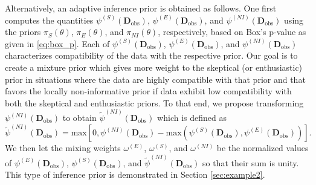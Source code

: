 \documentclass[AMA,STIX1COL,doublespace]{WileyNJD-v2}
\begin{document}
{
Alternatively, an adaptive inference prior is obtained as follows.
One first computes the quantities $\psi^{(S)}(\mathbf{D}_{\text{obs}})$, $\psi^{(E)}(\mathbf{D}_{\text{obs}})$, and $\psi^{(NI)}(\mathbf{D}_{\text{obs}})$ using the priors $\pi_S(\theta)$, 
$\pi_E(\theta)$, and $\pi_{NI}(\theta)$, respectively, based on Box's p-value as given in \eqref{eq:box_p}. 
Each of $\psi^{(S)}(\mathbf{D}_{\text{obs}})$, $\psi^{(E)}(\mathbf{D}_{\text{obs}})$, and $\psi^{(NI)}(\mathbf{D}_{\text{obs}})$ characterizes compatibility of the data with the respective prior.
Our goal is to create a mixture prior which gives more weight to the skeptical (or enthusiastic) prior in situations where the data are highly compatible 
with that prior and that favors the locally non-informative prior if data exhibit low compatibility with both the skeptical and enthusiastic priors.
 To that end, we propose transforming $\psi^{(NI)}(\mathbf{D}_{\text{obs}})$ to obtain $\tilde{\psi}^{(NI)}(\mathbf{D}_{\text{obs}})$ which is defined as
\begin{equation}\label{eq:3partmix_ni}
\tilde{\psi}^{(NI)}(\mathbf{D}_{\text{obs}})=\text{max}\left[0,\psi^{(NI)}(\mathbf{D}_{\text{obs}})-\text{max}\left(\psi^{(S)}(\mathbf{D}_{\text{obs}}),\psi^{(E)}(\mathbf{D}_{\text{obs}})\right)\right].
\end{equation}	
We then let the mixing weights $\omega^{(E)}$, $\omega^{(S)}$, and $\omega^{(NI)}$ be the normalized values of $\psi^{(E)}(\mathbf{D}_{\text{obs}})$, $\psi^{(S)}(\mathbf{D}_{\text{obs}})$, and $\tilde{\psi}^{(NI)}(\mathbf{D}_{\text{obs}})$ so that their sum is unity.
This type of inference prior is demonstrated in Section \ref{sec:example2}.
}
\end{document}
